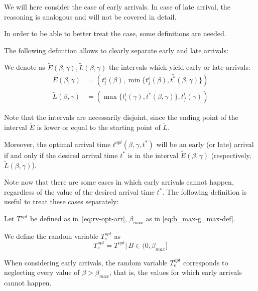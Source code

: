 We will here consider the case of early arrivals.
In case of late arrival, the reasoning is analogous and will not be covered in detail.

In order to be able to better treat the case,
some definitions are needed.

The following definition allows to clearly separate early and late arrivals:
\begin{definition}
  \label{def:intervals-tilde}
  We denote as \(\tilde{E}(\beta, \gamma), \tilde{L}(\beta, \gamma)\) the intervals which yield early or late arrivals:
  \begin{align*}
    \tilde{E}(\beta, \gamma) & = (t_i^e(\beta), \min\{t_f^e(\beta), \bar{t^*}(\beta, \gamma)\})\\
    \tilde{L}(\beta, \gamma) & = (\max\{t_i^l(\gamma), \bar{t^*}(\beta, \gamma)\}, t_f^l(\gamma))
  \end{align*}
\end{definition}

Note that the intervals are necessarily disjoint,
since the ending point of the interval \(\tilde{E}\) is lower or equal to the starting point of \(\tilde{L}\).

Moreover,
the optimal arrival time \(t^{opt}(\beta, \gamma, t^*)\) will be an early (or late) arrival
if and only if the desired arrival time \(t^*\)
is in the interval \(\tilde{E}(\beta, \gamma)\) (respectively, \(\tilde{L}(\beta, \gamma)\)).

Note now that there are some cases in which early arrivals cannot happen,
regardless of the value of the desired arrival time \(t^*\).
The following definition is useful to treat these cases separately:
\begin{definition}
  Let \(T^{opt}\) be defined as in~\eqref{eq:rv-opt-arr}, \(\beta_{max}\) as in \eqref{eq:b_max-g_max-def}.

  We define the random variable \(T_e^{opt}\) as
  \begin{equation*}
    T_e^{opt} = T^{opt} |\, B \in (0, \beta_{max}]
  \end{equation*}
\end{definition}

When considering early arrivals,
the random variable \(T_e^{opt}\) corresponds to neglecting every value of \(\beta > \beta_{max}\),
that is,
the values for which early arrivals cannot happen.

